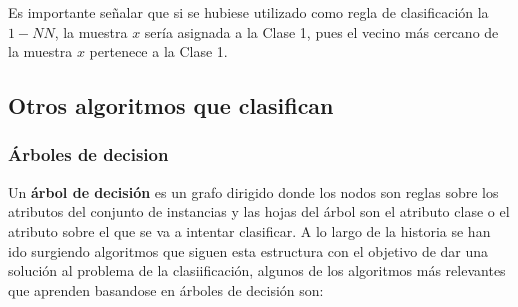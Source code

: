 \documentclass[a4paper, 11pt]{article} %
\begin{document}
\begin{shaded}
Es importante señalar que si se hubiese utilizado como regla de clasificación la $1-NN$, la muestra $x$ sería asignada a la Clase 1, pues el vecino más cercano de la muestra $x$ pertenece a la Clase 1.
\end{shaded}

\subsection{Otros algoritmos que clasifican}
\subsubsection{Árboles de decision}
Un \textbf{árbol de decisión} es un grafo dirigido donde los nodos son reglas sobre los atributos del conjunto de instancias y las hojas del árbol son el atributo clase o el atributo sobre el que se va a intentar clasificar. A lo largo de la historia se han ido surgiendo algoritmos que siguen esta estructura con el objetivo de dar una solución al problema de la clasiificación, algunos de los algoritmos más relevantes que aprenden basandose en árboles de decisión son:
\end{document}

